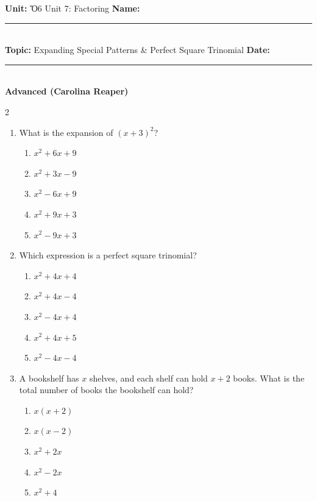 \documentclass[10pt]{article}
\begin{document}
\enlargethispage{2.5cm}

\begin{tcolorbox}[colback=mainblue!5, colframe=mainblue, sharp corners, boxrule=0.5pt]
    \small \textbf{Unit:} Ὅ6 Unit 7: Factoring \hfill \textbf{Name:} \rule{3cm}{0.4pt} \\
    \small \textbf{Topic:} Expanding Special Patterns & Perfect Square Trinomial \hfill \textbf{Date:} \rule{2cm}{0.4pt} \\
    \centering \textbf{\large Advanced (Carolina Reaper)}
\end{tcolorbox}

\vspace{0.2cm}

\begin{multicols}{2}
\begin{enumerate}[label=\textbf{Q\arabic*.}, leftmargin=*, itemsep=6pt, parsep=0pt]

  \item \small What is the expansion of $(x + 3)^2$?
  \begin{enumerate}[label=(\Alph*), leftmargin=0.6cm, nosep, itemsep=2pt]
    \item $x^2 + 6x + 9$
    \item $x^2 + 3x - 9$
    \item $x^2 - 6x + 9$
    \item $x^2 + 9x + 3$
    \item $x^2 - 9x + 3$
  \end{enumerate}

  \item \small Which expression is a perfect square trinomial?
  \begin{enumerate}[label=(\Alph*), leftmargin=0.6cm, nosep, itemsep=2pt]
    \item $x^2 + 4x + 4$
    \item $x^2 + 4x - 4$
    \item $x^2 - 4x + 4$
    \item $x^2 + 4x + 5$
    \item $x^2 - 4x - 4$
  \end{enumerate}

  \item \small A bookshelf has $x$ shelves, and each shelf can hold $x + 2$ books. What is the total number of books the bookshelf can hold?
  \begin{enumerate}[label=(\Alph*), leftmargin=0.6cm, nosep, itemsep=2pt]
    \item $x(x + 2)$
    \item $x(x - 2)$
    \item $x^2 + 2x$
    \item $x^2 - 2x$
    \item $x^2 + 4$
  \end{enumerate}


\end{enumerate}
\end{multicols}
\end{document}
